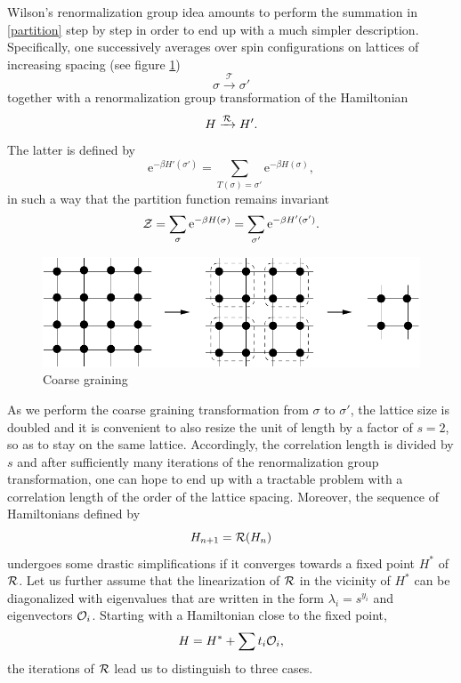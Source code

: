 \documentclass[12pt,here,feynmf]{article}
\begin{document}
Wilson's renormalization group idea  amounts to perform the summation in \eqref{partition} step by step in order to end up with a much simpler description. Specifically, one successively averages over spin configurations  on lattices of increasing spacing (see figure \ref{block})
\begin{equation}
\sigma\xrightarrow{\mathcal{T}}\sigma'
\end{equation}
together with a renormalization group transformation of the Hamiltonian
\begin{equation}
H\xrightarrow{{\cal R}}H'.
\end{equation}
The latter is defined by
\begin{equation}
\mathrm{e}^{-\beta H'(\sigma')}=
\mathop{\sum}\limits_{T(\sigma)=\sigma'}\mathrm{e}^{-\beta H(\sigma)},
\end{equation}
in such a way that the partition function remains invariant
\begin{equation}
{\cal Z}=\mathop{\sum}\limits_{\sigma}\mathrm{e}^{-\beta H(\sigma)}
=\mathop{\sum}\limits_{\sigma'}\mathrm{e}^{-\beta H'(\sigma')}.
\end{equation}

\begin{figure}
\begin{center}
\includegraphics[width=12cm]{coarse.pdf}
\caption{Coarse graining}
\label{block}
\end{center}
\end{figure}



As we perform the coarse graining transformation from  $\sigma$ to $\sigma'$, the lattice size is doubled and it is convenient to also resize the unit of length by a factor of $s=2$, so as to stay on the same lattice. Accordingly, the correlation length is divided by $s$ and after sufficiently many iterations of the renormalization group transformation, one can hope to end up with a tractable problem with a correlation length of the order of the lattice spacing.  Moreover, the sequence of Hamiltonians defined by
\begin{equation}
H_{n+1}={\cal R}(H_{n})
\end{equation}
undergoes some drastic simplifications if it converges towards a fixed point $H^{*}$ of ${\cal R}$. Let us further assume that the linearization of ${\cal R}$ in the vicinity of $H^{*}$ can be diagonalized with eigenvalues that are written in the form $\lambda_{i}=s^{y_{i}}$ and eigenvectors ${\cal O}_{i}$. Starting with a Hamiltonian close to the fixed point, 
\begin{equation}
H=H^{*}+\sum t_{i}{\cal O}_{i},
\end{equation}
the iterations of ${\cal R}$ lead us to distinguish to three cases.
\end{document}
